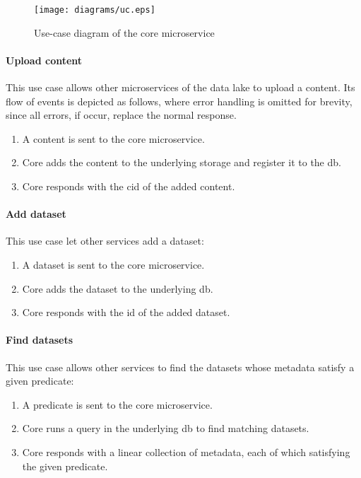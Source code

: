 \documentclass[a4paper,oneside,12pt]{book}
\begin{document}
\begin{figure}\centering
  \texttt{[image: diagrams/uc.eps]}
  \caption{Use-case diagram of the core microservice}
  \label{uc}
\end{figure}

\paragraph{Upload content}  This use case allows other microservices
of the data lake to upload a \gls{content}.  Its flow of events is depicted
as follows, where error handling is omitted for brevity, since all errors,
if occur, replace the normal response.
\begin{enumerate}
  \item A \gls{content} is sent to the core microservice.
  \item Core adds the content to the underlying storage
    and register it to the \gls{db}.
  \item Core responds with the \gls{cid} of the added \gls{content}.
\end{enumerate}

\paragraph{Add dataset}  This use case let other services add a dataset:
\begin{enumerate}
  \item A dataset is sent to the core microservice.
  \item Core adds the dataset to the underlying \gls{db}.
  \item Core responds with the \gls{id} of the added dataset.
\end{enumerate}

\paragraph{Find datasets}  This use case allows other services to find
the datasets whose metadata satisfy a given \gls{predicate}:
\begin{enumerate}
  \item A \gls{predicate} is sent to the core microservice.
  \item Core runs a query in the underlying \gls{db} to find matching datasets.
  \item Core responds with a linear collection of metadata,
    each of which satisfying the given \gls{predicate}.
\end{enumerate}
\end{document}

